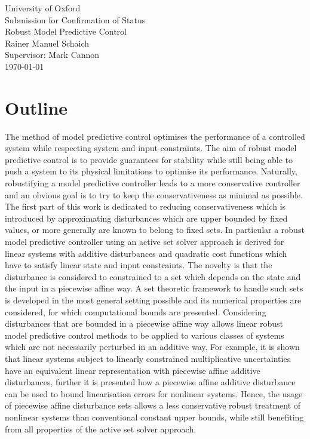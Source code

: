 \documentclass[a4paper,12pt]{scrartcl}
\begin{document}
\pagestyle{empty}
\begin{center}
{\Large{University of Oxford\\ \vspace{2em} Submission for Confirmation of Status\\ \vspace{4em}}}
{\Huge{Robust Model Predictive Control\\}}
{\Large{\vspace{3em} Rainer Manuel Schaich\\ \vspace{2em} Supervisor: Mark Cannon\\ \vspace{2em} \today}}
\end{center}
\pagebreak
\pagestyle{plain}
\section*{Outline}
\doublespacing

The method of model predictive control optimises the performance of a controlled system while respecting 
system and input constraints.
%
The aim of robust model predictive control is to provide guarantees for stability while still being able to push
a system to its physical limitations to optimise its performance.
%
Naturally, robustifying a model predictive controller leads to a more conservative controller and an obvious goal is
to try to keep the conservativeness as minimal as possible.
%
The first part of this work is dedicated to reducing conservativeness which is introduced by approximating
disturbances which are upper bounded by fixed values, or more generally are known to belong to fixed sets.
%
In particular a robust model predictive controller using an active set solver approach is derived for linear systems
with additive disturbances and quadratic cost functions which have to satisfy linear state and input constraints.
%
The novelty is that the disturbance is considered to constrained to a set which depends on the state and the input in
a piecewise affine way.
%
A set theoretic framework to handle such sets is developed in the most general setting possible and its numerical
properties are considered, for which computational bounds are presented.
%
Considering disturbances that are bounded in a piecewise affine way allows linear robust model predictive control
methods to be applied to various classes of systems which are not necessarily perturbed in an additive way.
%
For example, it is shown that linear systems subject to linearly constrained multiplicative uncertainties have an
equivalent linear representation with piecewise affine additive disturbances, further it is presented how a piecewise affine 
additive disturbance can be used to bound linearisation errors for nonlinear systems.
%
Hence, the usage of piecewise affine disturbance sets allows a less conservative robust treatment of nonlinear systems
than conventional constant upper bounds, while still benefiting from all properties of the active set solver approach.
\end{document}

